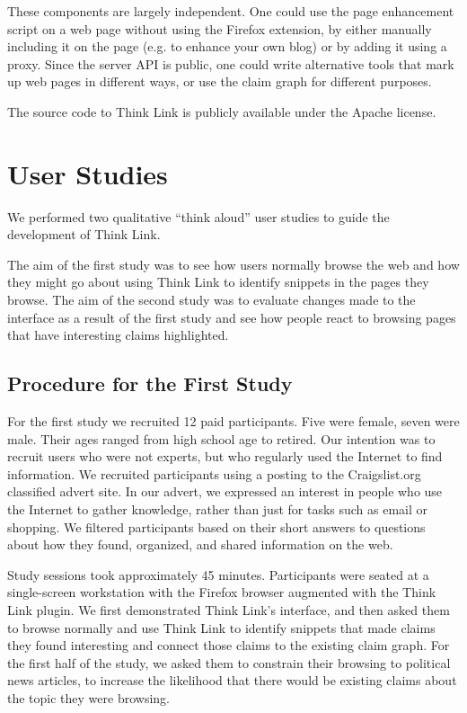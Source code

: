 \documentclass{chi2009}
\begin{document}
These components are largely independent. One could use the page enhancement script on a web page without using the Firefox extension, by either manually including it on the page (e.g. to enhance your own blog) or by adding it using a proxy. Since the server API is public, one could write alternative tools that mark up web pages in different ways, or use the claim graph for different purposes. 

The source code to Think Link is publicly available under the Apache license. 


\section{User Studies}

We performed two qualitative ``think aloud'' user studies to guide the development of Think Link. 

The aim of the first study was to see how users normally browse the web and how they might go about using Think Link to identify snippets in the pages they browse. The aim of the second study was to evaluate changes made to the interface as a result of the first study and see how people react to browsing pages that have interesting claims highlighted.

\subsection{Procedure for the First Study}

For the first study we recruited 12 paid participants. Five were female, seven were male. Their ages ranged from high school age to retired. Our intention was to recruit users who were not experts, but who regularly used the Internet to find information. We recruited participants using a posting to the Craigslist.org classified advert site. In our advert, we expressed an interest in people who use the Internet to gather knowledge, rather than just for tasks such as email or shopping. We filtered participants based on their short answers to questions about how they found, organized, and shared information on the web. 

Study sessions took approximately 45 minutes. Participants were seated at a single-screen workstation with the Firefox browser augmented with the Think Link plugin. We first demonstrated Think Link's interface, and then asked them to browse normally and use Think Link to identify snippets that made claims they found interesting and connect those claims to the existing claim graph. For the first half of the study, we asked them to constrain their browsing to political news articles, to increase the likelihood that there would be existing claims about the topic they were browsing.
\end{document}
